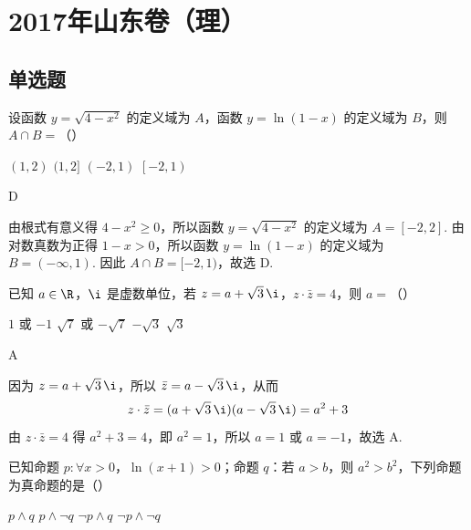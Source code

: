 \chapter{2017年山东卷（理）}

\section{单选题}

\begin{problem}
设函数 \(y=\sqrt{4-x^2}\) 的定义域为 \(A\)，函数 \(y=\ln(1-x)\) 的定义域为 \(B\)，则 \(A\cap B=\)（\quad）

\choices
    {\((1,2)\)}
    {\((1,2]\)}
    {\(\left(-2,1\right)\)}
    {\(\left[-2,1\right)\)}
\end{problem}

\begin{answer}
D
\end{answer}

\begin{solution}
由根式有意义得 \(4-x^2\geq 0\)，所以函数 \(y=\sqrt{4-x^2}\) 的定义域为 \(A=[-2,2]\). 由对数真数为正得 \(1-x>0\)，所以函数 \(y=\ln(1-x)\) 的定义域为 \(B=(-\infty,1)\). 因此 \(A\cap B=[-2,1)\)，故选 D.
\end{solution}

\begin{problem}
已知 \(a\in\R\)，\(\i\) 是虚数单位，若 \(z=a+\sqrt3\,\i\)，\(z\cdot\bar z=4\)，则 \(a=\)（\quad）

\choices
    {\(1\) 或 \(-1\)}
    {\(\sqrt7\) 或 \(-\sqrt7\)}
    {\(-\sqrt3\)}
    {\(\sqrt3\)}
\end{problem}

\begin{answer}
A
\end{answer}

\begin{solution}
因为 \(z=a+\sqrt3\,\i\)，所以 \(\bar z=a-\sqrt3\,\i\)，从而
\[
z\cdot\bar z=(a+\sqrt3\,\i)(a-\sqrt3\,\i)=a^2+3
\]
由 \(z\cdot\bar z=4\) 得 \(a^2+3=4\)，即 \(a^2=1\)，所以 \(a=1\) 或 \(a=-1\)，故选 A.
\end{solution}

\begin{problem}
已知命题 \(p:\forall x>0\)，\(\ln(x+1)>0\)；命题 \(q\)：若 \(a>b\)，则 \(a^2>b^2\)，下列命题为真命题的是（\quad）

\choices
    {\(p\land q\)}
    {\(p\land \lnot q\)}
    {\(\lnot p\land q\)}
    {\(\lnot p\land \lnot q\)}
\end{problem}

